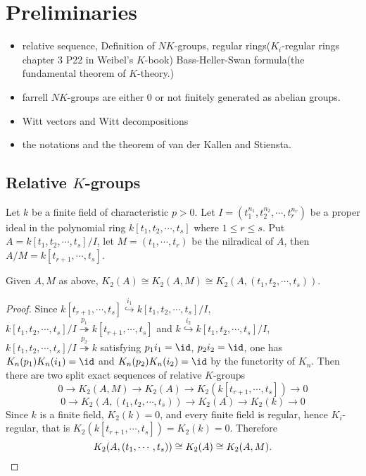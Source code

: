 \section{Preliminaries}
\begin{itemize}
	\item relative sequence, Definition of $NK$-groups, regular rings($K_i$-regular rings chapter 3 P22 in Weibel's $K$-book) Bass-Heller-Swan formula(the fundamental theorem of $K$-theory.)
	\item farrell $NK$-groups are either $0$ or not finitely generated as abelian groups.
	\item Witt vectors and Witt decompositions
	\item the notations and the theorem of van der Kallen and Stiensta. 
\end{itemize}

\subsection{Relative $K$-groups}
Let $k$ be a finite field of characteristic $ p>0 $. Let $ I=(t_1^{n_1},t_2^{n_2},\cdots,t_r^{n_r})$ be a proper ideal in the polynomial ring $k[t_1, t_2, \cdots, t_s]$ where $1\leq r \leq s$. Put $A=k[t_1,t_2,\cdots,t_s]/I$, let $M=(t_1,\cdots,t_r)$ be the nilradical of $A$, then $A/M=k[t_{r+1},\cdots,t_s]$. 
\begin{prop}
\label{prop:k2am}
	Given $A,M$ as above, $K_2(A)\cong K_2(A,M) \cong K_2(A,(t_1,t_2,\cdots,t_s))$.
\end{prop}
\begin{proof}%
	Since $k[t_{r+1},\cdots,t_s]\overset{i_1}\hookrightarrow k[t_1,t_2,\cdots,t_s]/I$, $k[t_1,t_2,\cdots,t_s]/I\overset{p_1}\twoheadrightarrow k[t_{r+1},\cdots,t_s]$ and $k\overset{i_2}\hookrightarrow k[t_1,t_2,\cdots,t_s]/I$, $k[t_1,t_2,\cdots,t_s]/I\overset{p_2}\twoheadrightarrow k$ satisfying $p_1i_1=\id$, $p_2i_2=\id$, one has $K_n(p_1)K_n(i_1)=\id$ and $K_n(p_2)K_n(i_2)=\id$ by the functority of $K_n$. Then there are two split exact sequences of relative $K$-groups 
	\[
	0\longrightarrow K_2(A, M) \longrightarrow K_2(A) \longrightarrow K_2(k[t_{r+1},\cdots,t_s]) \longrightarrow 0
	\]
	\[
	0\longrightarrow K_2(A, (t_1, t_2,\cdots,t_s)) \longrightarrow K_2(A) \longrightarrow K_2(k) \longrightarrow 0
	\]
	Since $k$ is a finite field, $K_2(k)=0$, and every finite field is regular, hence $K_i$-regular, that is $K_2(k[t_{r+1},\cdots,t_s])=K_2(k)=0$. Therefore
	\[K_2(A, (t_1,\cdots, t_s))\cong K_2(A) \cong K_2(A, M). \qedhere \]
\end{proof}

